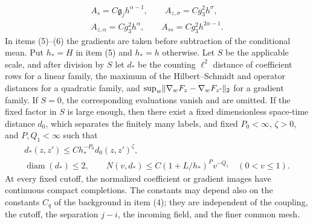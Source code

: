 \begin{lemma}
\begin{equation}
\begin{gathered}
 A_s=C\mathfrak g_jh^{\alpha-1},\qquad
 A_{z,\sigma}=Cg_3^2h^\sigma,\\
 A_{z,\alpha}=Cg_3^2h^\alpha,\qquad
 A_{ss}=Cg_3^2h^{2\alpha-1}.
 \end{gathered}
\end{equation}
In items (5)--(6) the gradients are taken before subtraction of the conditional mean. Put $h_*=H$ in item (5) and $h_*=h$ otherwise. Let $S$ be the applicable scale, and after division by $S$ let $d_*$ be the counting $\ell^2$ distance of coefficient rows for a linear family, the maximum of the Hilbert--Schmidt and operator distances for a quadratic family, and $\sup_w\lVert \nabla_wF_z-\nabla_wF_{z'}\rVert_2$ for a gradient family. If $S=0$, the corresponding evaluations vanish and are omitted. If the fixed factor in $S$ is large enough, then there exist a fixed dimensionless space-time distance $d_0$, which separates the finitely many labels, and fixed $P_0<\infty$, $\zeta>0$, and $P,Q_1<\infty$ such that
\begin{equation}\label{ch30:eq:metric-cover}
 \begin{gathered}
 d_*(z,z')\le Ch_*^{-P_0}d_0(z,z')^\zeta,\\
 \operatorname{diam}(d_*)\le2,\qquad
 N(v,d_*)\le C(1+L/h_*)^Pv^{-Q_1}\quad(0<v\le1).
 \end{gathered}
\end{equation}
At every fixed cutoff, the normalized coefficient or gradient images have continuous compact completions. The constants may depend also on the constants $C_q$ of the background in item (4); they are independent of the coupling, the cutoff, the separation $j-i$, the incoming field, and the finer common mesh.
\end{lemma}
